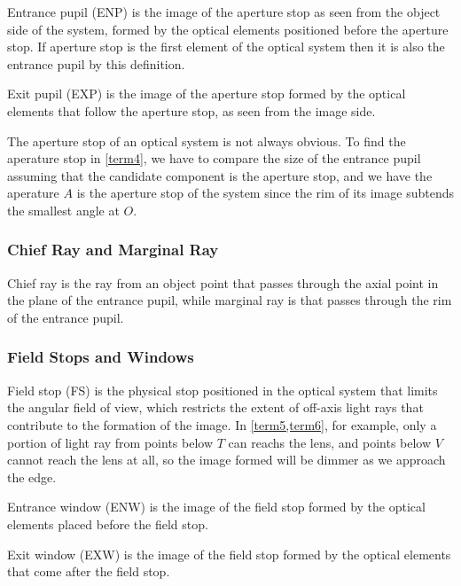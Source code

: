 \documentclass[english,a4paper,12pt]{report}
\begin{document}
Entrance pupil (ENP) is the image of the aperture stop as seen from the object side of the system, formed by the optical elements positioned before the aperture stop. If aperture stop is the first element of the optical system then it is also the entrance pupil by this definition. 

Exit pupil (EXP) is the image of the aperture stop formed by the optical elements that follow the aperture stop, as seen from the image side.



The aperture stop of an optical system is not always obvious. To find the aperature stop in \cref{term4}, we have to compare the size of the entrance pupil assuming that the candidate component is the aperture stop, and we have the aperature \(A\) is the aperture stop of the system since the rim of its image subtends the smallest angle at \(O\). 


\subsubsection{Chief Ray and Marginal Ray}

Chief ray is the ray from an object point that passes through the axial point in the plane of the entrance pupil, while marginal ray is that passes through the rim of the entrance pupil.

\subsubsection{Field Stops and Windows}

Field stop (FS) is the physical stop positioned in the optical system that limits the angular field of view, which restricts the extent of off-axis light rays that contribute to the formation of the image. In \cref{term5,term6}, for example, only a portion of light ray from points below \(T\) can reachs the lens, and points below \(V\) cannot reach the lens at all, so the image formed will be dimmer as we approach the edge. 

Entrance window (ENW) is the image of the field stop formed by the optical elements placed before the field stop.

Exit window (EXW) is the image of the field stop formed by the optical elements that come after the field stop.

\end{document}
